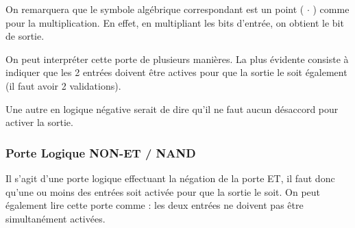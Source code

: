 \documentclass[11pt,a4paper]{article}
\begin{document}
On remarquera que le symbole algébrique correspondant est un point ( $ \cdot $ ) comme pour la multiplication.
En effet, en multipliant les bits d'entrée, on obtient le bit de sortie.

\medskip

On peut interpréter cette porte de plusieurs manières.
La plus évidente consiste à indiquer que les 2 entrées doivent être actives pour que la sortie le soit également (il faut avoir 2 validations).

Une autre en logique négative serait de dire qu'il ne faut aucun désaccord pour activer la sortie.

\medskip

\vfillFirst

\vfillLast

\subsubsection{Porte Logique NON-ET / NAND}

Il s'agit d'une porte logique effectuant la négation de la porte ET, il faut donc qu'une ou moins des entrées soit activée pour que la sortie le soit.
On peut également lire cette porte comme : les deux entrées ne doivent pas être simultanément activées.

\medskip
\end{document}
